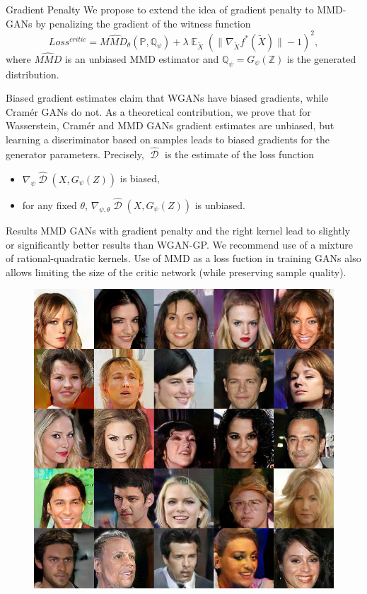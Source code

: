 \documentclass[xcolor={table}]{beamer}
\DeclareMathOperator{\D}{\mathcal{D}}
\DeclareMathOperator*{\E}{\mathbb{E}}
\newcommand{\PP}{\mathbb P}
\newcommand{\QQ}{\mathbb Q}
\newcommand{\ZZ}{\mathbb Z}
\begin{document}
\begin{frame}{}
\begin{columns}[T, totalwidth=\textwidth]
  \begin{column}{.32\textwidth}
    \begin{block}{Gradient Penalty}
      We propose to extend the idea of gradient penalty to MMD-GANs by penalizing the
      gradient of the witness function 
      \[ Loss^{critic} = \widehat{MMD_{\theta}}(\PP, \QQ_{\psi}) + \lambda\E_{\tilde{X}}\left(\|\nabla_{\tilde{X}} f^*(\tilde{X})\| - 1\right)^2, \]
      where $\widehat{MMD}$ is an unbiased MMD estimator and $\QQ_{\psi} = G_{\psi}(\ZZ)$ is the generated distribution.
    \end{block}
    \vspace*{-1cm}
    \begin{block}{Biased gradient estimates}
      \citet{cramer-gan} claim that WGANs have biased gradients, while Cram\'er GANs do not. 
      As a theoretical contribution, we prove that for Wasserstein, Cram\'er and MMD GANs gradient estimates
      are unbiased, but learning a discriminator based on samples leads to biased gradients 
      for the generator parameters. Precisely, $\widehat{\D}$ is the estimate of the loss function 
      \begin{itemize} 
        \item $\nabla_{\psi}\widehat{\D}(X, G_{\psi}(Z))$ is biased,
        \item for any fixed $\theta$, $\nabla_{\psi, \theta} \widehat{\D}(X, G_{\psi}(Z))$ is unbiased.
      \end{itemize}
    \end{block}
    \vspace*{-1cm}
    \begin{block}{Results}
      MMD GANs with gradient penalty and the right kernel lead to slightly or significantly better results 
      than WGAN-GP. We recommend use of a mixture of rational-quadratic kernels.
      Use of MMD as a loss fuction in training GANs also allows limiting the size of the critic 
      network (while preserving sample quality). 
    \end{block}
    \vspace*{-1cm}
    \begin{figure}
      \centering
      \includegraphics[width=.32\columnwidth]{samples/celeba-mmd-rq-25.png}

\end{figure}
\end{column}
\end{columns}
\end{frame}
\end{document}
